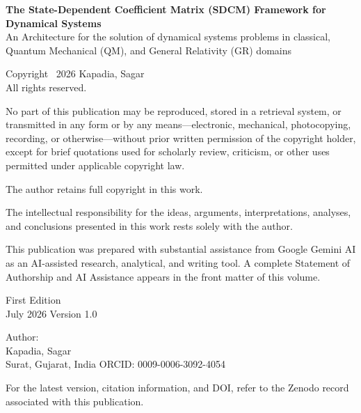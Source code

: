 \thispagestyle{empty}

\vspace*{\fill}

\begin{center}
	
	{\Large\textbf{The State-Dependent Coefficient Matrix (SDCM) Framework for Dynamical Systems}}\\[0.5em]
	
	{\large An Architecture for the solution of dynamical systems problems in  classical, Quantum Mechanical (QM), and General Relativity (GR) domains}
	
	Copyright \textcopyright\ 2026 Kapadia, Sagar\\
	All rights reserved.
	
	\vspace{1.5em}
	
	No part of this publication may be reproduced, stored in a retrieval
	system, or transmitted in any form or by any means---electronic,
	mechanical, photocopying, recording, or otherwise---without prior written
	permission of the copyright holder, except for brief quotations used for
	scholarly review, criticism, or other uses permitted under applicable
	copyright law.
	
	\vspace{1.5em}
	
	The author retains full copyright in this work.
	
	\vspace{1.5em}
	
	The intellectual responsibility for the ideas, arguments,
	interpretations, analyses, and conclusions presented in this work rests
	solely with the author.
	
	This publication was prepared with substantial assistance from Google Gemini AI as an AI-assisted research, analytical, and writing tool. A
	complete Statement of Authorship and AI Assistance appears in the front
	matter of this volume.
	
	\vspace{1.5em}
	
	First Edition\\
	July 2026 Version 1.0
	
	\vspace{1.5em}
	
	Author:\\
	Kapadia, Sagar\\
	Surat, Gujarat, India
	ORCID: 0009-0006-3092-4054
	
	\vspace{1.5em}
	
	For the latest version, citation information, and DOI, refer to the
	Zenodo record associated with this publication.
	
\end{center}

\vspace*{\fill}

\clearpage